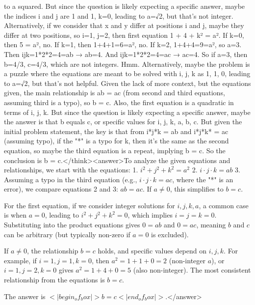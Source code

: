 to a squared. But since the question is likely expecting a specific answer, maybe the indices i and j are 1 and 1, k=0, leading to a=√2, but that's not integer. Alternatively, if we consider that x and y differ at positions i and j, maybe they differ at two positions, so i=1, j=2, then first equation 1 + 4 + k² = a². If k=0, then 5 = a², no. If k=1, then 1+4+1=6=a², no. If k=2, 1+4+4=9=a², so a=3. Then ijk=1*2*2=4=ab → ab=4. And ijk=1*2*2=4=ac → ac=4. So if a=3, then b=4/3, c=4/3, which are not integers. Hmm. Alternatively, maybe the problem is a puzzle where the equations are meant to be solved with i, j, k as 1, 1, 0, leading to a=√2, but that's not helpful. Given the lack of more context, but the equations given, the main relationship is ab = ac (from second and third equations, assuming third is a typo), so b = c. Also, the first equation is a quadratic in terms of i, j, k. But since the question is likely expecting a specific answer, maybe the answer is that b equals c, or specific values for i, j, k, a, b, c. But given the initial problem statement, the key is that from i*j*k = ab and i*j*k* = ac (assuming typo), if the "*" is a typo for k, then it's the same as the second equation, so maybe the third equation is a repeat, implying b = c. So the conclusion is b = c.</think><answer>To analyze the given equations and relationships, we start with the equations:  
1. \( i^2 + j^2 + k^2 = a^2 \)  
2. \( i \cdot j \cdot k = ab \)  
3. Assuming a typo in the third equation (e.g., \( i \cdot j \cdot k = ac \), where the "*" is an error), we compare equations 2 and 3:  
   \( ab = ac \). If \( a \neq 0 \), this simplifies to \( b = c \).  

For the first equation, if we consider integer solutions for \( i, j, k, a \), a common case is when \( a = 0 \), leading to \( i^2 + j^2 + k^2 = 0 \), which implies \( i = j = k = 0 \). Substituting into the product equations gives \( 0 = ab \) and \( 0 = ac \), meaning \( b \) and \( c \) can be arbitrary (but typically non-zero if \( a = 0 \) is excluded).  

If \( a \neq 0 \), the relationship \( b = c \) holds, and specific values depend on \( i, j, k \). For example, if \( i = 1, j = 1, k = 0 \), then \( a^2 = 1 + 1 + 0 = 2 \) (non-integer \( a \)), or \( i = 1, j = 2, k = 0 \) gives \( a^2 = 1 + 4 + 0 = 5 \) (also non-integer). The most consistent relationship from the equations is \( b = c \).  

The answer is \(<|begin_of_box|>b = c<|end_of_box|>\).</answer>